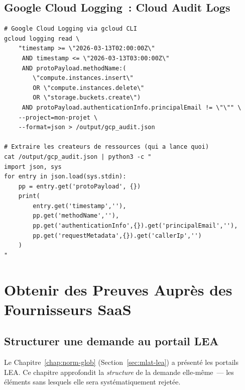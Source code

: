 \subsection{Google Cloud Logging~: Cloud Audit Logs}

\begin{lstlisting}[language=bash_forensique,
    caption={Google Cloud Audit Logs --- analyse forensique}]
# Google Cloud Logging via gcloud CLI
gcloud logging read \
    "timestamp >= \"2026-03-13T02:00:00Z\"
     AND timestamp <= \"2026-03-13T03:00:00Z\"
     AND protoPayload.methodName:(
        \"compute.instances.insert\"
        OR \"compute.instances.delete\"
        OR \"storage.buckets.create\")
     AND protoPayload.authenticationInfo.principalEmail != \"\"" \
    --project=mon-projet \
    --format=json > /output/gcp_audit.json

# Extraire les createurs de ressources (qui a lance quoi)
cat /output/gcp_audit.json | python3 -c "
import json, sys
for entry in json.load(sys.stdin):
    pp = entry.get('protoPayload', {})
    print(
        entry.get('timestamp',''),
        pp.get('methodName',''),
        pp.get('authenticationInfo',{}).get('principalEmail',''),
        pp.get('requestMetadata',{}).get('callerIp','')
    )
"
\end{lstlisting}

\section{Obtenir des Preuves Auprès des Fournisseurs SaaS}
\label{sec:preuve-saas}

\subsection{Structurer une demande au portail LEA}

Le Chapitre~\ref{chap:norm-glob} (Section~\ref{sec:mlat-lea}) a
présenté les portails LEA. Ce chapitre approfondit la \emph{structure}
de la demande elle-même~--- les éléments sans lesquels elle sera
systématiquement rejetée.

